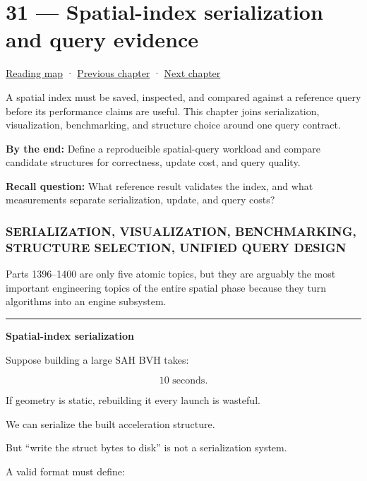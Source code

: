 \hypertarget{06-engine-ii-ch031}{}
\chapter{31 --- Spatial-index serialization and query evidence}\label{06-engine-ii-ch031-spatial-index-serialization-and-query-evidence}

\hyperref[volume-reading-map]{Reading map} · \hyperref[06-engine-ii-ch030]{Previous chapter} · \hyperref[06-engine-ii-ch032]{Next chapter}

A spatial index must be saved, inspected, and compared against a reference query before its performance claims are useful. This chapter joins serialization, visualization, benchmarking, and structure choice around one query contract.

\textbf{By the end:} Define a reproducible spatial-query workload and compare candidate structures for correctness, update cost, and query quality.

\textbf{Recall question:} What reference result validates the index, and what measurements separate serialization, update, and query costs?

\subsection{SERIALIZATION, VISUALIZATION, BENCHMARKING, STRUCTURE SELECTION, UNIFIED QUERY DESIGN}\label{06-engine-ii-ch031-serialization-visualization-benchmarking-structure-selection-unified-query-design}

Parts 1396--1400 are only five atomic topics, but they are arguably the most important engineering topics of the entire spatial phase because they turn algorithms into an engine subsystem.

\begin{center}\rule{0.5\linewidth}{0.5pt}\end{center}

\textbf{Spatial-index serialization}

Suppose building a large SAH BVH takes:

\[
10\text{ seconds}.
\]

If geometry is static, rebuilding it every launch is wasteful.

We can serialize the built acceleration structure.

But ``write the struct bytes to disk'' is not a serialization system.

A valid format must define:

